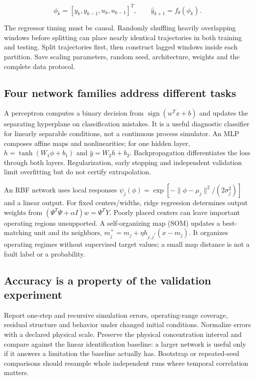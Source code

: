\documentclass[11pt,a4paper]{article}
\begin{document}
\[\phi_k=[y_k,y_{k-1},u_k,u_{k-1}]^T,\qquad \hat y_{k+1}=f_\theta(\phi_k).\]

The regressor timing must be causal. Randomly shuffling heavily overlapping windows before splitting can place nearly identical trajectories in both training and testing. Split trajectories first, then construct lagged windows inside each partition. Save scaling parameters, random seed, architecture, weights and the complete data protocol.


\subsection{Four network families address different tasks}

A perceptron computes a binary decision from $\operatorname{sign}(w^Tx+b)$ and updates the separating hyperplane on classification mistakes. It is a useful diagnostic classifier for linearly separable conditions, not a continuous process simulator. An MLP composes affine maps and nonlinearities; for one hidden layer, $h=\tanh(W_1\phi+b_1)$ and $\hat y=W_2h+b_2$. Backpropagation differentiates the loss through both layers. Regularization, early stopping and independent validation limit overfitting but do not certify extrapolation.


An RBF network uses local responses $\psi_j(\phi)=\exp[-\|\phi-\mu_j\|^2/(2\sigma_j^2)]$ and a linear output. For fixed centers/widths, ridge regression determines output weights from $(\Psi^T\Psi+\alpha I)w=\Psi^TY$. Poorly placed centers can leave important operating regions unsupported. A self-organizing map (SOM) updates a best-matching unit and its neighbors, $m_j^+=m_j+\eta h_{j,j^*}(x-m_j)$. It organizes operating regimes without supervised target values; a small map distance is not a fault label or a probability.


\subsection{Accuracy is a property of the validation experiment}

Report one-step and recursive simulation errors, operating-range coverage, residual structure and behavior under changed initial conditions. Normalize errors with a declared physical scale. Preserve the physical concentration interval and compare against the linear identification baseline: a larger network is useful only if it answers a limitation the baseline actually has. Bootstrap or repeated-seed comparisons should resample whole independent runs where temporal correlation matters.
\end{document}

